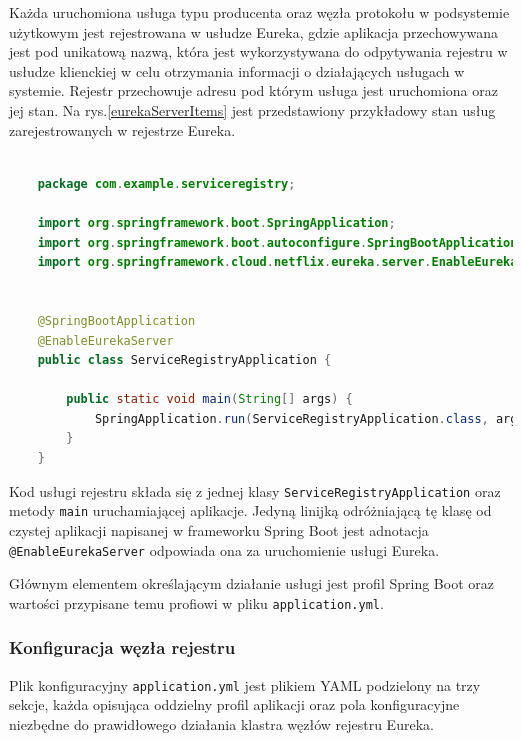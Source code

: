 Każda uruchomiona usługa typu producenta oraz węzła protokołu w podsystemie użytkowym jest rejestrowana w usłudze Eureka, gdzie aplikacja przechowywana jest pod unikatową nazwą, która jest wykorzystywana do odpytywania rejestru w usłudze klienckiej w celu otrzymania informacji o działających usługach w systemie. Rejestr przechowuje adresu pod którym usługa jest uruchomiona oraz jej stan. Na rys.\ref{eurekaServerItems} jest przedstawiony przykładowy stan usług zarejestrowanych w rejestrze Eureka.

\begin{lstlisting}[language=Java, caption=Implementacja rejestru usług serwera Eureka]
    
    package com.example.serviceregistry;
    
    import org.springframework.boot.SpringApplication;
    import org.springframework.boot.autoconfigure.SpringBootApplication;
    import org.springframework.cloud.netflix.eureka.server.EnableEurekaServer;
    
    
    @SpringBootApplication
    @EnableEurekaServer
    public class ServiceRegistryApplication {
    
    	public static void main(String[] args) {
    		SpringApplication.run(ServiceRegistryApplication.class, args);
    	}
    }
\end{lstlisting}

Kod usługi rejestru składa się z jednej klasy \verb|ServiceRegistryApplication| oraz metody \verb|main| uruchamiającej aplikacje. Jedyną linijką odróżniającą tę klasę od czystej aplikacji napisanej w frameworku Spring Boot jest adnotacja \verb|@EnableEurekaServer| odpowiada ona za uruchomienie usługi Eureka.

Głównym elementem określającym działanie usługi jest profil Spring Boot oraz wartości przypisane temu profiowi w pliku \verb|application.yml|. 

\subsubsection{Konfiguracja węzła rejestru}

Plik konfiguracyjny \verb|application.yml| jest plikiem YAML podzielony na trzy sekcje, każda opisująca oddzielny profil aplikacji oraz  pola konfiguracyjne niezbędne do prawidłowego działania klastra węzłów rejestru Eureka. 

